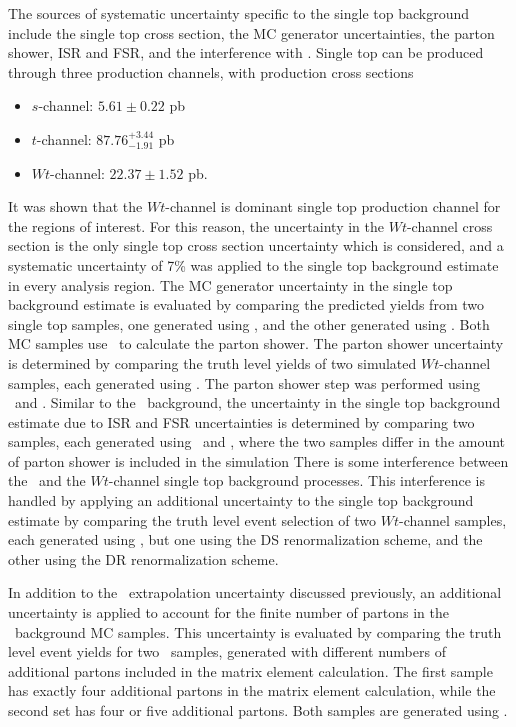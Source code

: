 The sources of systematic uncertainty specific to the single top background
include the single top cross section, the MC generator uncertainties, the parton
shower, ISR and FSR, and the interference with \TTBAR.
Single top can be produced through three production channels, with production
cross sections
\begin{itemize}
  \item $s$-channel: $5.61 \pm 0.22$ pb
  \item $t$-channel: $87.76^{+3.44}_{-1.91}$ pb
  \item $Wt$-channel: $22.37 \pm 1.52$ pb.
\end{itemize}
It was shown that the $Wt$-channel is dominant single top production channel for
the regions of interest.
For this reason, the uncertainty in the $Wt$-channel cross section is the only
single top cross section uncertainty which is considered, and a systematic
uncertainty of 7\% was applied to the single top background estimate in every
analysis region.
The MC generator uncertainty in the single top background estimate is evaluated
by comparing the predicted yields from two single top samples, one generated
using \powheg, and the other generated using \mcnlo.
Both MC samples use \herwig\ to calculate the parton shower.
The parton shower uncertainty is determined by comparing the truth level yields
of two simulated $Wt$-channel samples, each generated using \herwig.
The parton shower step was performed using \pythia\ and \herwig.
Similar to the \TTBAR\ background, the uncertainty in the single top background
estimate due to ISR and FSR uncertainties is determined by comparing two
samples, each generated using \acermc\ and \pythia, where the two samples
differ in the amount of parton shower is included in the simulation
There is some interference between the \TTBAR\ and the $Wt$-channel single top
background processes.
This interference is handled by applying an additional uncertainty to the single
top background estimate by comparing the truth level event selection of two
$Wt$-channel samples, each generated using \powheg, but one using the DS
renormalization scheme, and the other using the DR renormalization scheme.

In addition to the \HT\ extrapolation uncertainty discussed previously, an
additional uncertainty is applied to account for the finite number of partons in
the \ZGAMMAJETS\ background MC samples.
This uncertainty is evaluated by comparing the truth level event yields for two
\ZGAMMAJETS\ samples, generated with different numbers of additional partons
included in the matrix element calculation.
The first sample has exactly four additional partons in the matrix element
calculation, while the second set has four or five additional partons.
Both samples are generated using \sherpa.

